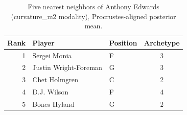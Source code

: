 \begin{table}[htbp]
  \centering\small
  \begin{tabular}{rllc}
    \toprule
    Rank & Player & Position & Archetype \\
    \midrule
    1 & Sergei Monia & F & 3 \\
    2 & Justin Wright-Foreman & G & 3 \\
    3 & Chet Holmgren & C & 2 \\
    4 & D.J. Wilson & F & 4 \\
    5 & Bones Hyland & G & 2 \\
    \bottomrule
  \end{tabular}
  \caption{Five nearest neighbors of Anthony Edwards (curvature_m2 modality), Procrustes-aligned posterior mean.}
  \label{tab:Anthony_Edwards_neighbors_curvature_m2}
\end{table}

